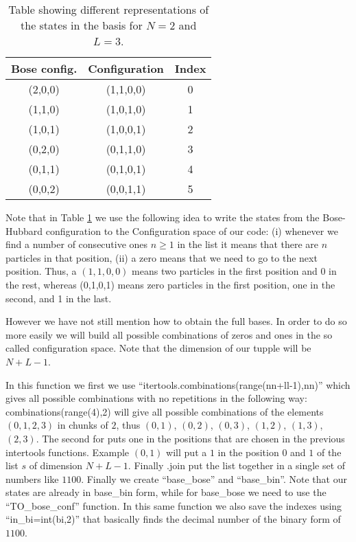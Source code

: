 \documentclass[paper=a4, fontsize=11pt]{scrartcl} %
\numberwithin{equation}{section} %
\numberwithin{figure}{section} %
\numberwithin{table}{section} %
\begin{document}
\begin{table}[h!]
  \begin{center}
    \label{tab:table1}
    \begin{tabular}{c|c|c} %
      \textbf{Bose config.} & \textbf{Configuration} & \textbf{Index}\\
      \hline
      (2,0,0) 		& 	(1,1,0,0)		& 		0	\\
      (1,1,0) 		& 	(1,0,1,0)		& 		1	\\
      (1,0,1) 		& 	(1,0,0,1)		& 		2	\\
      (0,2,0) 		& 	(0,1,1,0)		& 		3	\\
      (0,1,1) 		& 	(0,1,0,1)		& 		4	\\
      (0,0,2) 		& 	(0,0,1,1) 		& 		5	\\
    \end{tabular}
    \caption{Table showing different representations of the states in the basis for $N=2$ and $L=3$.}    
  \end{center}
\end{table}

Note that in Table \ref{tab:table1} we use the following idea to write the states from the Bose-Hubbard configuration to the Configuration space of our code: (i) whenever we find a number of consecutive ones $n\ge1$ in the list it means that there are $n$ particles in that position, (ii) a zero means that we need to go to the next position. Thus, a $(1,1,0,0)$ means two particles in the first position and 0 in the rest, whereas (0,1,0,1) means zero particles in the first position, one in the second, and 1 in the last.


However we have not still mention how to obtain the full bases. In order to do so more easily we will build all possible combinations of zeros and ones in the so called configuration space. Note that the dimension of our tupple will be $N+L-1$. 



In this function we first we use ``itertools.combinations(range(nn+ll-1),nn)'' which gives all possible combinations with no repetitions in the following way: combinations(range(4),2) will give all possible combinations of the elements $(0,1,2,3)$ in chunks of $2$, thus $(0,1)$, $(0,2)$, $(0,3)$, $(1,2)$, $(1,3)$, $(2,3)$. 
The second for puts one in the positions that are chosen in the previous intertools functions. Example $(0,1)$ will put a $1$ in the position $0$ and $1$ of the list $s$ of dimension $N+L-1$. Finally .join  put the list together in a single set of numbers like $1100$. Finally we create ``base\_bose'' and ``base\_bin''. Note that our states are already in base\_bin form, while for base\_bose we need to use the ``TO\_bose\_conf'' function. In this same function we also save the indexes using ``in\_bi=int(bi,2)'' that basically finds the decimal number of the binary form of $1100$.
\end{document}
